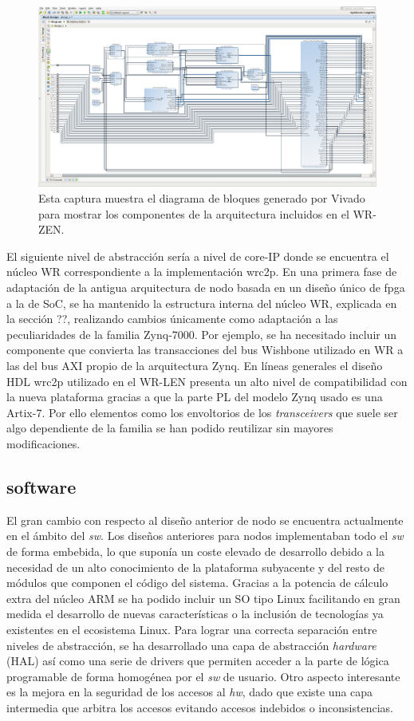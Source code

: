 \begin{figure}
	\centering
	\includegraphics[width=0.8\linewidth]{imagenes/vivado_zen}
	\caption[Captura de Vivado con el diagrama de bloques de la arquitectura 
	del WR-ZEN]{Esta captura muestra el diagrama de bloques generado por Vivado 
	para mostrar los componentes de la arquitectura incluidos en el WR-ZEN.}
	\label{fig:vivadozen}
\end{figure}

El siguiente nivel de abstracción sería a nivel de core-IP donde se encuentra 
el núcleo WR correspondiente a la implementación \gls{wrc2p}. En una primera 
fase de adaptación de la antigua arquitectura de nodo basada en un diseño único 
de \gls{fpga} a la de SoC, se ha mantenido la estructura interna del núcleo WR, 
explicada en la sección ??, realizando cambios únicamente como adaptación a las 
peculiaridades de la familia Zynq-7000. Por ejemplo, se ha necesitado incluir 
un componente que convierta las transacciones del bus Wishbone utilizado en WR 
a las del bus AXI propio de la arquitectura Zynq. En líneas generales el diseño 
HDL \gls{wrc2p} utilizado en el WR-LEN presenta un alto nivel de compatibilidad 
con la nueva plataforma gracias a que la parte PL del modelo Zynq usado es una 
Artix-7. Por ello elementos como los envoltorios de los \textit{transceivers} 
que suele ser algo dependiente de la familia se han podido reutilizar sin 
mayores modificaciones.

\subsection{software}

El gran cambio con respecto al diseño anterior de nodo se encuentra actualmente 
en el ámbito del \textit{sw}. Los diseños anteriores para nodos implementaban 
todo el \textit{sw} de forma embebida, lo que suponía un coste elevado de 
desarrollo debido a la necesidad de un alto conocimiento de la plataforma 
subyacente y del resto de módulos que componen el código del sistema. Gracias a 
la potencia de cálculo extra del núcleo ARM se ha podido incluir un SO tipo 
Linux facilitando en gran medida el desarrollo de nuevas características o la 
inclusión de tecnologías ya existentes en el ecosistema Linux. Para lograr una 
correcta separación entre niveles de abstracción, se ha desarrollado una capa 
de abstracción \textit{hardware} (HAL) así como una serie de drivers que 
permiten acceder a la parte de lógica programable de forma homogénea por el 
\textit{sw} de usuario. Otro aspecto interesante es la mejora en la seguridad 
de los accesos al \textit{hw}, dado que existe una capa intermedia que arbitra 
los accesos evitando accesos indebidos o inconsistencias.

